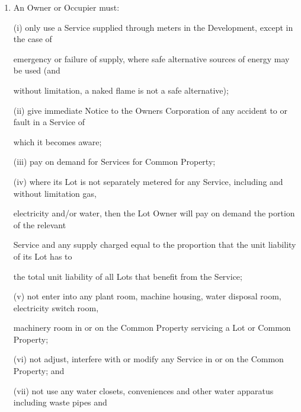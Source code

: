\documentclass{article}
\begin{document}
\begin{enumerate}[label=\arabic*.]
\begin{enumerate}[label=\arabic{enumi}.\arabic*.]
\begin{enumerate}[label=(\arabic*)]
\begin{enumerate}[label=(\alph*)]
{\fontsize{10.02}{1}way (except temporarily as consented to by the Owners Corporation and the Owner and }

{\fontsize{10.02}{1}Occupier of any Lot affected); and }

{\fontsize{9.962}{1}(iii) any support or shelter provided by that Lot or the Common Property for any other Lot or the }

{\fontsize{10.02}{1}Common Property is interfered with. }

\item {\fontsize{9.962}{1} An Owner or Occupier must: }

{\fontsize{9.962}{1}(i) only use a Service supplied through meters in the Development, except in the case of }

{\fontsize{10.02}{1}emergency or failure of supply, where safe alternative sources of energy may be used (and }

{\fontsize{10.02}{1}without limitation, a naked flame is not a safe alternative); }

{\fontsize{9.962}{1}(ii) give immediate Notice to the Owners Corporation of any accident to or fault in a Service of }

{\fontsize{10.02}{1}which it becomes aware; }

{\fontsize{9.962}{1}(iii) pay on demand for Services for Common Property; }

{\fontsize{9.962}{1}(iv) where its Lot is not separately metered for any Service, including and without limitation gas, }

\newpage

{\fontsize{10.02}{1}electricity and/or water, then the Lot Owner will pay on demand the portion of the relevant }

{\fontsize{10.02}{1}Service and any supply charged equal to the proportion that the unit liability of its Lot has to }

{\fontsize{10.02}{1}the total unit liability of all Lots that benefit from the Service; }

{\fontsize{9.962}{1}(v) not enter into any plant room, machine housing, water disposal room, electricity switch room, }

{\fontsize{10.02}{1}machinery room in or on the Common Property servicing a Lot or Common Property; }

{\fontsize{9.962}{1}(vi) not adjust, interfere with or modify any Service in or on the Common Property; and }

{\fontsize{9.962}{1}(vii) not use any water closets, conveniences and other water apparatus including waste pipes and }


\end{enumerate}
\end{enumerate}
\end{enumerate}
\end{enumerate}
\end{document}
